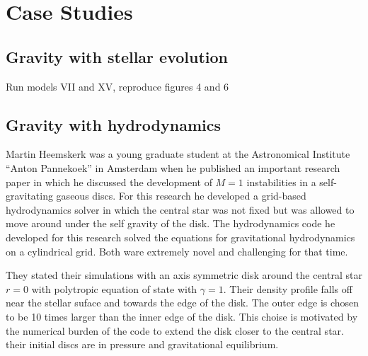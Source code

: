 %

        {}

\section{Case Studies}\label{Ch:CaseStudies:Introduction}

\subsection{Gravity with stellar evolution}
\cite{1987MNRAS.224..193T}
Run models VII and XV, reproduce figures 4 and 6


\subsection{Gravity with hydrodynamics}

Martin Heemskerk was a young graduate student at the Astronomical
Institute ``Anton Pannekoek'' in Amsterdam when he published an
important research paper \cite{1992A&A...260..161H} in which he
discussed the development of $M=1$ instabilities in a self-gravitating
gaseous discs. For this research he developed a grid-based
hydrodynamics solver in which the central star was not fixed but was
allowed to move around under the self gravity of the disk. The
hydrodynamics code he developed for this research solved the equations
for gravitational hydrodynamics on a cylindrical grid. Both ware
extremely novel and challenging for that time.

They stated their simulations with an axis symmetric disk around the
central star $r=0$ with polytropic equation of state with $\gamma =
1$.  Their density profile falls off near the stellar suface and
towards the edge of the disk. The outer edge is chosen to be 10 times
larger than the inner edge of the disk. This choise is motivated by
the numerical burden of the code to extend the disk closer to the
central star.  their initial discs are in pressure and gravitational
equilibrium.

